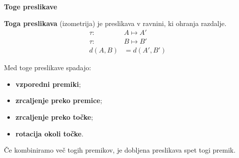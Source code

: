         \begin{frame}
            \large\textbf{Toge preslikave}
            ~\\
            \normalsize

            \begin{alertblock}{}
                \textbf{Toga preslikava} (izometrija) je preslikava v ravnini, ki ohranja razdalje.
                \begin{align*}
                    \tau:~ &A \mapsto A' \\ 
                    \tau:~ &B \mapsto B' \\ 
                    d(A,B)&=d(A',B')
                \end{align*}
            \end{alertblock}

            Med toge preslikave spadajo:
                \begin{itemize}
                    \item \textbf{vzporedni premiki};
                    \item \textbf{zrcaljenje preko premice};
                    \item \textbf{zrcaljenje preko točke};
                    \item \textbf{rotacija okoli točke}.
                \end{itemize}

            Če kombiniramo več togih premikov, je dobljena preslikava spet togi premik.

        \end{frame}

